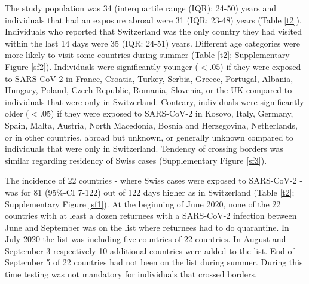 \documentclass[10pt, a4paper, twoside]{article}
\begin{document}
\begin{multicols}{2}

The study population was 34 (interquartile range (IQR): 24-50) years and individuals that had an exposure abroad were 31 (IQR: 23-48) years (Table \ref{t2}).
Individuals who reported that Switzerland was the only country they had visited within the last 14 days were 35 (IQR: 24-51) years.
Different age categories were more likely to visit some countries during summer (Table \ref{t2}; Supplementary Figure \ref{sf2}).
Individuals were significantly younger ($<.05$) if they were exposed to SARS-CoV-2 in France, Croatia, Turkey, Serbia, Greece, Portugal, Albania, Hungary, Poland, Czech Republic, Romania, Slovenia, or the UK compared to individuals that were only in Switzerland.
Contrary, individuals were significantly older ($<.05$) if they were exposed to SARS-CoV-2 in Kosovo, Italy, Germany, Spain, Malta, Austria, North Macedonia, Bosnia and Herzegovina, Netherlands, or in other countries, abroad but unknown, or generally unknown compared to individuals that were only in Switzerland.
Tendency of crossing borders was similar regarding residency of Swiss cases (Supplementary Figure \ref{sf3}).

The incidence of 22 countries - where Swiss cases were exposed to SARS-CoV-2 - was for 81 (95\%-CI 7-122) out of 122 days higher as in Switzerland (Table \ref{t2}; Supplementary Figure \ref{sf1}).
At the beginning of June 2020, none of the 22 countries with at least a dozen returnees with a SARS-CoV-2 infection between June and September was on the list where returnees had to do quarantine.
In July 2020 the list was including five countries of 22 countries.
In August and September 3 respectively 10 additional countries were added to the list.
End of September 5 of 22 countries had not been on the list during summer.
During this time testing was not mandatory for individuals that crossed borders.



\end{multicols}
\end{document}
